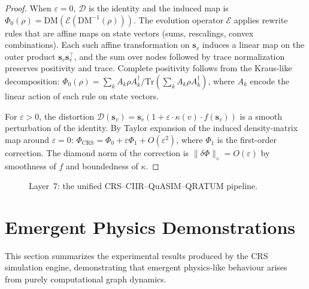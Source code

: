 \begin{proof}
When $\varepsilon = 0$, $\mathcal{D}$ is the identity and the
induced map is $\Phi_0(\rho) = \mathrm{DM}(\mathcal{E}(
\mathrm{DM}^{-1}(\rho)))$.  The evolution operator $\mathcal{E}$
applies rewrite rules that are affine maps on state vectors (sums,
rescalings, convex combinations).  Each such affine transformation
on $\mathbf{s}_v$ induces a linear map on the outer product
$\mathbf{s}_v \mathbf{s}_v^\top$, and the sum over nodes followed by
trace normalization preserves positivity and trace.  Complete
positivity follows from the Kraus-like decomposition: $\Phi_0(\rho) =
\sum_k A_k \rho A_k^\dagger / \mathrm{Tr}(\sum_k A_k \rho
A_k^\dagger)$, where $A_k$ encode the linear action of each rule on
state vectors.

For $\varepsilon > 0$, the distortion
$\mathcal{D}(\mathbf{s}_v) = \mathbf{s}_v (1 + \varepsilon \cdot
\kappa(v) \cdot f(\mathbf{s}_v))$
is a smooth perturbation of the identity.  By Taylor expansion of the
induced density-matrix map around $\varepsilon = 0$:
$\Phi_{\mathrm{CRS}} = \Phi_0 + \varepsilon \Phi_1 +
O(\varepsilon^2)$,
where $\Phi_1$ is the first-order correction.  The diamond norm of
the correction is $\|\delta\Phi\|_\diamond = O(\varepsilon)$ by
smoothness of $f$ and boundedness of $\kappa$.
\end{proof}

\begin{figure}[t]
\centering
{}
\caption{Layer~7: the unified CRS--CIIR--QuASIM--QRATUM pipeline.}
\label{fig:c11:integration}
\end{figure}

\section{Emergent Physics Demonstrations}
\label{sec:ch11:experiments}

This section summarizes the experimental results produced by the CRS
simulation engine, demonstrating that emergent physics-like behaviour
arises from purely computational graph dynamics.


